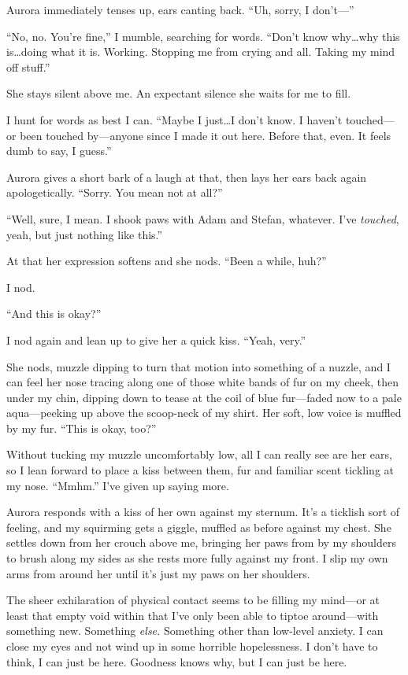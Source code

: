 Aurora immediately tenses up, ears canting back. ``Uh, sorry, I don't---''

``No, no. You're fine,'' I mumble, searching for words. ``Don't know why\ldots{}why this is\ldots{}doing what it is. Working. Stopping me from crying and all. Taking my mind off stuff.''

She stays silent above me. An expectant silence she waits for me to fill.

I hunt for words as best I can. ``Maybe I just\ldots{}I don't know. I haven't touched---or been touched by---anyone since I made it out here. Before that, even. It feels dumb to say, I guess.''

Aurora gives a short bark of a laugh at that, then lays her ears back again apologetically. ``Sorry. You mean not at all?''

``Well, sure, I mean. I shook paws with Adam and Stefan, whatever. I've \emph{touched}, yeah, but just nothing like this.''

At that her expression softens and she nods. ``Been a while, huh?''

I nod.

``And this is okay?''

I nod again and lean up to give her a quick kiss. ``Yeah, very.''

She nods, muzzle dipping to turn that motion into something of a nuzzle, and I can feel her nose tracing along one of those white bands of fur on my cheek, then under my chin, dipping down to tease at the coil of blue fur---faded now to a pale aqua---peeking up above the scoop-neck of my shirt. Her soft, low voice is muffled by my fur. ``This is okay, too?''

Without tucking my muzzle uncomfortably low, all I can really see are her ears, so I lean forward to place a kiss between them, fur and familiar scent tickling at my nose. ``Mmhm.'' I've given up saying more.

Aurora responds with a kiss of her own against my sternum. It's a ticklish sort of feeling, and my squirming gets a giggle, muffled as before against my chest. She settles down from her crouch above me, bringing her paws from by my shoulders to brush along my sides as she rests more fully against my front. I slip my own arms from around her until it's just my paws on her shoulders.

The sheer exhilaration of physical contact seems to be filling my mind---or at least that empty void within that I've only been able to tiptoe around---with something new. Something \emph{else.} Something other than low-level anxiety. I can close my eyes and not wind up in some horrible hopelessness. I don't have to think, I can just be here. Goodness knows why, but I can just be here.

